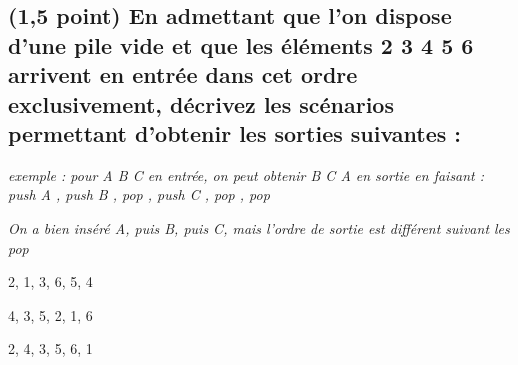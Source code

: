 \documentclass[11pt,a4paper]{article}
\begin{document}
\bigskip
\bigskip



\vfillLast

\clearpage

\subsection{(1,5 point) En admettant que l'on dispose d'une pile vide et que les éléments  2 3 4 5 6 \fg{} arrivent en entrée dans cet ordre exclusivement, décrivez les scénarios permettant d'obtenir les sorties suivantes : }


\medskip

\begin{center}
\noindent \textit{exemple : pour \og A B C \fg{} en entrée, on peut obtenir \og B C A \fg{} en sortie en faisant : \linebreak
\og push A \fg, \og push B \fg, \og pop \fg, \og push C \fg, \og pop \fg, \og pop \fg }

\noindent \textit{On a bien inséré A, puis B, puis C, mais l'ordre de sortie est différent suivant les \og pop \fg}
\end{center}

\medskip



\begin{center}

\begin{large}
2, 1, 3, 6, 5, 4
\end{large}

\begin{center}
\end{center}


\begin{large}
4, 3, 5, 2, 1, 6
\end{large}

\begin{center}
\end{center}


\begin{large}
2, 4, 3, 5, 6, 1
\end{large}

\begin{center}
\end{center}

\end{center}
\end{document}
